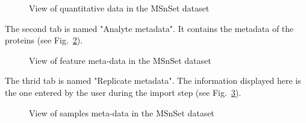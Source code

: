 \documentclass[12pt]{article}
\begin{document}
\begin {figure}
\centering
{}
\caption{View of quantitative data in the MSnSet dataset}\label{fig:sdqv1}
\end {figure}


The second tab is named "Analyte metadata". It contains the metadata of the 
proteins (see Fig.~\ref{fig:sdqv2}).

\begin {figure}
\centering
{}
\caption{View of feature meta-data in the MSnSet dataset}\label{fig:sdqv2}
\end {figure}

The thrid tab is named "Replicate metadata". The information displayed here 
is the one entered by the user during the import step 
(see Fig.~\ref{fig:sdqv3}).

\begin {figure}
\centering
{}
\caption{View of samples meta-data in the MSnSet dataset}\label{fig:sdqv3}
\end {figure}
\end{document}
